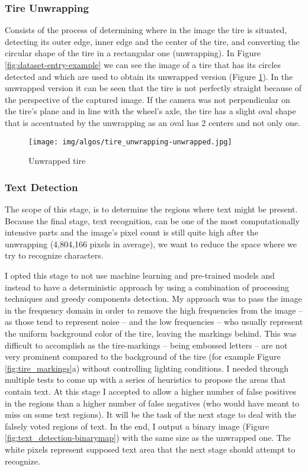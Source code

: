 \subsubsection{Tire Unwrapping}

Consists of the process of determining where in the image the tire is situated, detecting its outer edge, inner edge and the center of the tire, and converting the circular shape of the tire in a rectangular one (unwrapping). In Figure \ref{fig:dataset-entry-example} we can see the image of a tire that has its circles detected and which are used to obtain its unwrapped version (Figure \ref{fig:tire_unwrapping-unwrapped}). In the unwrapped version it can be seen that the tire is not perfectly straight because of the perspective of the captured image. If the camera was not perpendicular on the tire's plane and in line with the wheel's axle, the tire has a slight oval shape that is accentuated by the unwrapping as an oval has 2 centers and not only one.

\begin{figure}
    \centering
    \texttt{[image: img/algos/tire\_unwrapping-unwrapped.jpg]}
    \caption{Unwrapped tire}
    \label{fig:tire_unwrapping-unwrapped}
\end{figure}

\subsubsection{Text Detection}

The scope of this stage, is to determine the regions where text might be present. Because the final stage, text recognition, can be one of the most computationally intensive parts and the image's pixel count is still quite high after the unwrapping (4,804,166 pixels in average), we want to reduce the space where we try to recognize characters.

I opted this stage to not use machine learning and pre-trained models and instead to have a deterministic approach by using a combination of processing techniques and greedy components detection. My approach was to pass the image in the frequency domain in order to remove the high frequencies from the image -- as those tend to represent noise -- and the low frequencies -- who usually represent the uniform background color of the tire, leaving the markings behind. This was difficult to accomplish as the tire-markings -- being embossed letters -- are not very prominent compared to the background of the tire (for example Figure \ref{fig:tire_markings}a) without controlling lighting conditions. I needed through multiple tests to come up with a series of heuristics to propose the areas that contain text. At this stage I accepted to allow a higher number of false positives in the regions than a higher number of false negatives (who would have meant to miss on some text regions). It will be the task of the next stage to deal with the falsely voted regions of text. In the end, I output a binary image (Figure \ref{fig:text_detection-binarymap}) with the same size as the unwrapped one. The white pixels represent supposed text area that the next stage should attempt to recognize.

